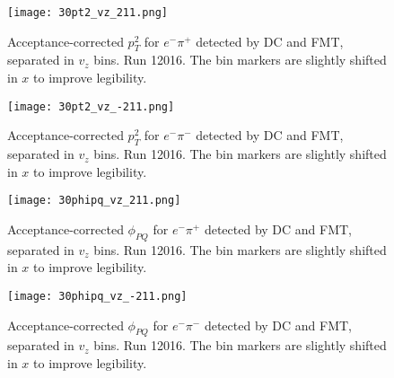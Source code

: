    \begin{figure}
        \centering
        \texttt{[image: 30pt2\_vz\_211.png]}
        \caption[Acceptance-corrected $p_T^2$ for $e^-\pi^+$ separated in $v_z$ bins]
        {Acceptance-corrected $p_T^2$ for $e^-\pi^+$ detected by DC and FMT, separated in $v_z$ bins.
        Run 12016.
        The bin markers are slightly shifted in $x$ to improve legibility.}
        \label{fig::14.30::pt2_211_vz}
    \end{figure}

    \begin{figure}
        \centering
        \texttt{[image: 30pt2\_vz\_-211.png]}
        \caption[Acceptance-corrected $p_T^2$ for $e^-\pi^-$ separated in $v_z$ bins]
        {Acceptance-corrected $p_T^2$ for $e^-\pi^-$ detected by DC and FMT, separated in $v_z$ bins.
        Run 12016.
        The bin markers are slightly shifted in $x$ to improve legibility.}
        \label{fig::14.30::pt2_-211_vz}
    \end{figure}

    \begin{figure}
        \centering
        \texttt{[image: 30phipq\_vz\_211.png]}
        \caption[Acceptance-corrected $\phi_{PQ}$ for $e^-\pi^+$ separated in $v_z$ bins]
        {Acceptance-corrected $\phi_{PQ}$ for $e^-\pi^+$ detected by DC and FMT, separated in $v_z$ bins.
        Run 12016.
        The bin markers are slightly shifted in $x$ to improve legibility.}
        \label{fig::14.30::phipq_211_vz}
    \end{figure}

    \begin{figure}
        \centering
        \texttt{[image: 30phipq\_vz\_-211.png]}
        \caption[Acceptance-corrected $\phi_{PQ}$ for $e^-\pi^-$ separated in $v_z$ bins]
        {Acceptance-corrected $\phi_{PQ}$ for $e^-\pi^-$ detected by DC and FMT, separated in $v_z$ bins.
        Run 12016.
        The bin markers are slightly shifted in $x$ to improve legibility.}
        \label{fig::14.30::phipq_-211_vz}
    \end{figure}

